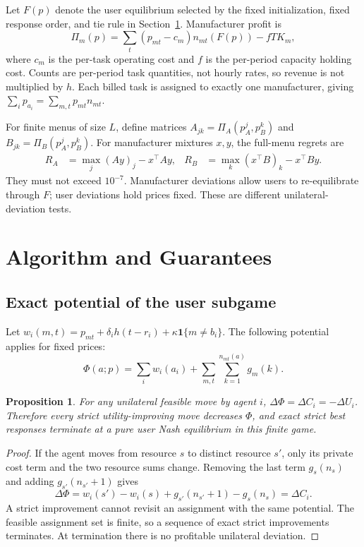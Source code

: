 \documentclass[11pt,a4paper]{article}
\newtheorem{proposition}{Proposition}
\begin{document}
Let $F(p)$ denote the user equilibrium selected by the fixed initialization, fixed response order, and tie rule in Section~\ref{sec:algorithm}. Manufacturer profit is
\begin{equation}
 \Pi_m(p)=\sum_t(p_{mt}-c_m)n_{mt}(F(p))-fTK_m,
 \label{eq:profit}
\end{equation}
where $c_m$ is the per-task operating cost and $f$ is the per-period capacity holding cost. Counts are per-period task quantities, not hourly rates, so revenue is not multiplied by $h$. Each billed task is assigned to exactly one manufacturer, giving $\sum_i p_{a_i}=\sum_{m,t}p_{mt}n_{mt}$.

For finite menus of size $L$, define matrices $A_{jk}=\Pi_A(p_A^j,p_B^k)$ and $B_{jk}=\Pi_B(p_A^j,p_B^k)$. For manufacturer mixtures $x,y$, the full-menu regrets are
\begin{align}
 R_A&=\max_j(Ay)_j-x^\top Ay, &
 R_B&=\max_k(x^\top B)_k-x^\top By.
 \label{eq:providerregret}
\end{align}
They must not exceed $10^{-7}$. Manufacturer deviations allow users to re-equilibrate through $F$; user deviations hold prices fixed. These are different unilateral-deviation tests.

\section{Algorithm and Guarantees}\label{sec:algorithm}
\subsection{Exact potential of the user subgame}
Let $w_i(m,t)=p_{mt}+\delta_i h(t-r_i)+\kappa\mathbf{1}\{m\ne b_i\}$. The following potential applies for fixed prices:
\begin{equation}
 \Phi(a;p)=\sum_i w_i(a_i)+\sum_{m,t}\sum_{k=1}^{n_{mt}(a)}g_m(k).
 \label{eq:potential}
\end{equation}
\begin{proposition}
For any unilateral feasible move by agent $i$, $\Delta\Phi=\Delta C_i=-\Delta U_i$. Therefore every strict utility-improving move decreases $\Phi$, and exact strict best responses terminate at a pure user Nash equilibrium in this finite game.
\end{proposition}
\begin{proof}
If the agent moves from resource $s$ to distinct resource $s'$, only its private cost term and the two resource sums change. Removing the last term $g_s(n_s)$ and adding $g_{s'}(n_{s'}+1)$ gives
\[
 \Delta\Phi=w_i(s')-w_i(s)+g_{s'}(n_{s'}+1)-g_s(n_s)=\Delta C_i.
\]
A strict improvement cannot revisit an assignment with the same potential. The feasible assignment set is finite, so a sequence of exact strict improvements terminates. At termination there is no profitable unilateral deviation.
\end{proof}
\end{document}
